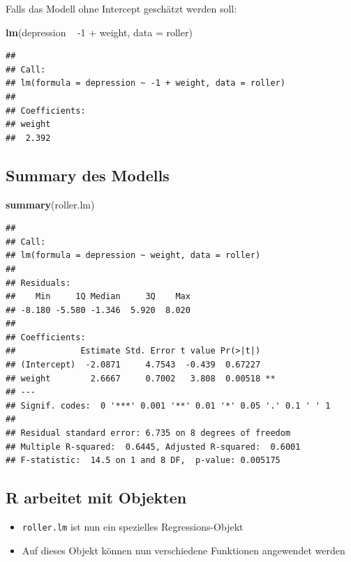\documentclass[]{article}
\newenvironment{Shaded}{\begin{snugshade}}{\end{snugshade}}
\newcommand{\KeywordTok}[1]{\textcolor[rgb]{0.13,0.29,0.53}{\textbf{{#1}}}}
\newcommand{\DataTypeTok}[1]{\textcolor[rgb]{0.13,0.29,0.53}{{#1}}}
\newcommand{\DecValTok}[1]{\textcolor[rgb]{0.00,0.00,0.81}{{#1}}}
\newcommand{\StringTok}[1]{\textcolor[rgb]{0.31,0.60,0.02}{{#1}}}
\newcommand{\NormalTok}[1]{{#1}}
\providecommand{\tightlist}{%
  \setlength{\itemsep}{0pt}\setlength{\parskip}{0pt}}
\begin{document}
Falls das Modell ohne Intercept geschätzt werden soll:

\begin{Shaded}
\begin{Highlighting}[]
\KeywordTok{lm}\NormalTok{(depression ~}\StringTok{ }\NormalTok{-}\DecValTok{1} \NormalTok{+}\StringTok{ }\NormalTok{weight, }\DataTypeTok{data =} \NormalTok{roller)}
\end{Highlighting}
\end{Shaded}

\begin{verbatim}
## 
## Call:
## lm(formula = depression ~ -1 + weight, data = roller)
## 
## Coefficients:
## weight  
##  2.392
\end{verbatim}

\subsection{Summary des Modells}\label{summary-des-modells}

\begin{Shaded}
\begin{Highlighting}[]
\KeywordTok{summary}\NormalTok{(roller.lm)}
\end{Highlighting}
\end{Shaded}

\begin{verbatim}
## 
## Call:
## lm(formula = depression ~ weight, data = roller)
## 
## Residuals:
##    Min     1Q Median     3Q    Max 
## -8.180 -5.580 -1.346  5.920  8.020 
## 
## Coefficients:
##             Estimate Std. Error t value Pr(>|t|)   
## (Intercept)  -2.0871     4.7543  -0.439  0.67227   
## weight        2.6667     0.7002   3.808  0.00518 **
## ---
## Signif. codes:  0 '***' 0.001 '**' 0.01 '*' 0.05 '.' 0.1 ' ' 1
## 
## Residual standard error: 6.735 on 8 degrees of freedom
## Multiple R-squared:  0.6445, Adjusted R-squared:  0.6001 
## F-statistic:  14.5 on 1 and 8 DF,  p-value: 0.005175
\end{verbatim}

\subsection{R arbeitet mit Objekten}\label{r-arbeitet-mit-objekten}

\begin{itemize}
\tightlist
\item
  \texttt{roller.lm} ist nun ein spezielles Regressions-Objekt
\item
  Auf dieses Objekt können nun verschiedene Funktionen angewendet werden
\end{itemize}
\end{document}
